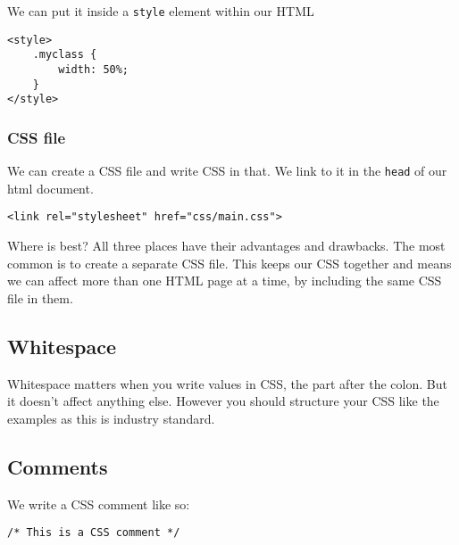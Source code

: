 We can put it inside a \texttt{style} element within our HTML

\begin{verbatim}
<style>
    .myclass {
        width: 50%;
    }
</style>
\end{verbatim}

\subsubsection{CSS file}

We can create a CSS file and write CSS in that. We link to it in the \texttt{head} of our html document.

\begin{verbatim}
<link rel="stylesheet" href="css/main.css">
\end{verbatim}


\begin{infobox}{Where is best?}
    All three places have their advantages and drawbacks. The most common is to create a separate CSS file. This keeps our CSS together and means we can affect more than one HTML page at a time, by including the same CSS file in them.
\end{infobox}

\subsection{Whitespace}

Whitespace matters when you write values in CSS, the part after the colon. But it doesn't affect anything else. However you should structure your CSS like the examples as this is industry standard.

\subsection{Comments}

We write a CSS comment like so:

\begin{verbatim}
/* This is a CSS comment */
\end{verbatim}

